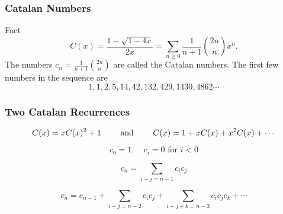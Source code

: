 \documentclass[xcolor=dvipsnames]{beamer}
\begin{document}
\begin{frame} \frametitle{Catalan Numbers}
  \pause
  \begin{block}{Fact}
    $$ 
    C(x) = \frac{1 - \sqrt{1 - 4x}}{2x} 
      = \sum_{n \geq 0} \frac{1}{n+1} \binom{2n}{n} x^n.
    $$
    \pause
    The numbers $c_n = \frac{1}{n+1} \binom{2n}{n}$ are called the Catalan
    numbers. 
    The first few numbers in the sequence are
    $$ 1, 1, 2, 5, 14, 42, 132, 429, 1430, 4862 \cdots $$
  \end{block}
    
\end{frame}

\begin{frame} \frametitle{Two Catalan Recurrences}
  \pause
  $$ C(x) = xC(x)^2 + 1 \text{ \qquad and \qquad } C(x) = 1 + x C(x) + x^2 C(x) +
  \cdots$$

  \pause 
  \vspace{1pc}

  $$ c_0 = 1, \quad c_i = 0 \text{\ for $i < 0$}$$ 

  \vspace{6pt}

  $$ c_n = \sum_{i+j = n-1} c_i c_j $$

  \vspace{6pt}


  $$ c_n = c_{n-1} + \sum_{i+j = n-2} c_i c_j + \sum_{i + j + k = n-3} c_i c_j c_k
    + \cdots $$
\end{frame}
\end{document}

